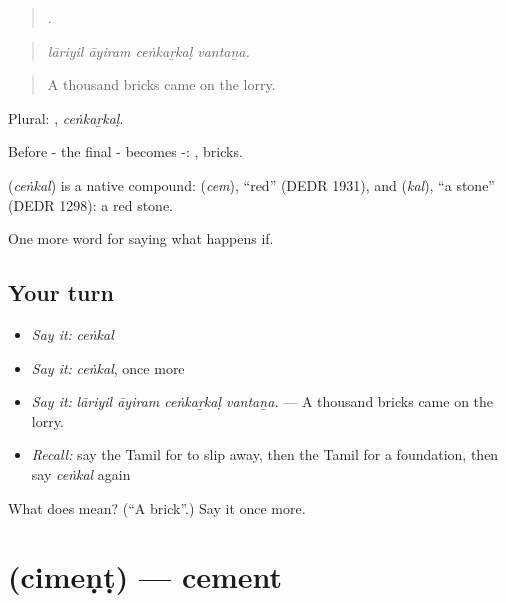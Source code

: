 \begin{quote}
   .
\end{quote}

\begin{quote}
\emph{lāriyil āyiram ceṅkaṟkaḷ vantaṉa.}
\end{quote}

\begin{quote}
A thousand bricks came on the lorry.
\end{quote}

Plural: , \emph{ceṅkaṟkaḷ}.

Before - the final - becomes -: , bricks.

\begin{cousinweb}
\textbf{} (\emph{ceṅkal}) is a native compound:  (\emph{cem}), \textquotedblleft{}red\textquotedblright{} (DEDR 1931), and  (\emph{kal}), \textquotedblleft{}a stone\textquotedblright{} (DEDR 1298): a red stone.
\end{cousinweb}

\begin{grammarlens}[title={What you've built}]
One more word for saying what happens if.
\end{grammarlens}

\subsection*{Your turn}
\begin{itemize}
\raggedright
  \item \emph{Say it:} \emph{ceṅkal}
  \item \emph{Say it:} \emph{ceṅkal}, once more
  \item \emph{Say it:} \emph{lāriyil āyiram ceṅkaṟkaḷ vantaṉa.} — A thousand bricks came on the lorry.
  \item \emph{Recall:} say the Tamil for to slip away, then the Tamil for a foundation, then say \emph{ceṅkal} again
\end{itemize}

\begin{tcolorbox}[breakable,colback=teal!4,colframe=teal!35!black,title={Before you move on}]
What does  mean? (\textquotedblleft{}A brick\textquotedblright{}.) Say it once more.
\end{tcolorbox}
\section[\texorpdfstring{\ta{சிமெண்ட்} (cimeṇṭ)}{சிமெண்ட் (cimeṇṭ)}]{ (cimeṇṭ) — cement}

